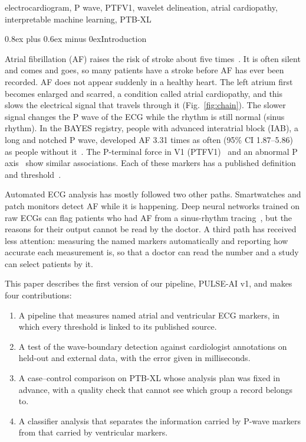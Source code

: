 \documentclass[conference]{IEEEtran}
\makeatletter
\def\section{\@startsection{section}{1}{\z@}{2.6ex plus 1.2ex minus 1ex}%
  {0.8ex plus 0.6ex minus 0ex}{\normalfont\normalsize\centering\bfseries}}
\makeatother
\begin{document}
\begin{IEEEkeywords}
electrocardiogram, P wave, PTFV1, wavelet delineation, atrial cardiopathy,
interpretable machine learning, PTB-XL
\end{IEEEkeywords}

\section{Introduction}

Atrial fibrillation (AF) raises the risk of stroke about five
times~\cite{wolf1991framingham}. It is often silent and comes and goes, so many
patients have a stroke before AF has ever been recorded. AF does not appear
suddenly in a healthy heart. The left atrium first becomes enlarged and scarred,
a condition called atrial cardiopathy, and this slows the electrical signal that
travels through it (Fig.~\ref{fig:chain}). The slower signal changes the P wave
of the ECG while the rhythm is still normal (sinus rhythm). In the BAYES
registry, people with advanced interatrial block (IAB), a long and notched P
wave, developed AF 3.31 times as often (95\% CI 1.87--5.86) as people
without it~\cite{martinezselles2020bayes}. The P-terminal force in V1
(PTFV1)~\cite{morris1964ptfv1} and an abnormal P axis~\cite{maheshwari2017paxis}
show similar associations. Each of these markers has a published definition and
threshold~\cite{bayesdeluna2012iab,hancock2009aha5}.

Automated ECG analysis has mostly followed two other paths. Smartwatches and
patch monitors detect AF while it is happening. Deep neural networks trained on
raw ECGs can flag patients who had AF from a sinus-rhythm
tracing~\cite{attia2019af}, but the reasons for their output cannot be read by
the doctor. A third path has received less attention: measuring the named
markers automatically and reporting how accurate each measurement is, so that a
doctor can read the number and a study can select patients by it.

This paper describes the first version of our pipeline, PULSE-AI v1, and makes
four contributions:
\begin{enumerate}
\item A pipeline that measures named atrial and ventricular ECG markers, in which
every threshold is linked to its published source.
\item A test of the wave-boundary detection against cardiologist annotations on
held-out and external data, with the error given in milliseconds.
\item A case--control comparison on PTB-XL whose analysis plan was fixed in
advance, with a quality check that cannot see which group a record belongs to.
\item A classifier analysis that separates the information carried by P-wave
markers from that carried by ventricular markers.
\end{enumerate}
\end{document}
